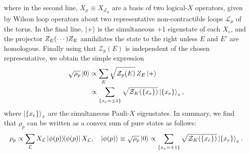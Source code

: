 where in the second line, $\overline{X}_{\mu} \equiv X_{\mathcal{L}_{\mu}}$ are a basis of two logical-$X$ operators, given by Wilson loop operators about two representative non-contractible loops $\mathcal{L}_{\mu}$ of the torus. In the final line, $\ket{+}$ is the simultaneous +1 eigenstate of each $X_e$, and the projector $Z_E \qty( \cdots ) Z_E$ annihilates the state to the right unless $E$ and $E'$ are homologous. Finally using that $\mathcal{Z}_p(E)$ is independent of the chosen representative, we obtain the simple expression
\begin{equation}
    \begin{split}
        \sqrt{\rho_p} \ket{0} &\propto \sum_{E} \sqrt{\mathcal{Z}_p(E)} \, Z_E \ket{+} \\
        &\propto \sum_{\qty{x_e = \pm 1}} \sqrt{\mathcal{Z}_K(\qty{x_e})} \ket{\qty{x_e}}_x ,
    \end{split}
\end{equation}
where $\ket{\qty{x_e}}_x$ are the simultaneous Pauli-$X$ eigenstates. In summary, we find that $\rho_p$ can be written as a convex sum of pure states as follows:
\begin{equation}
\label{eq:phi_p}
    \rho_p \propto \sum_{\mathcal{L}} X_{\mathcal{L}} \dyad{\phi(p)} X_{\mathcal{L}}, \quad \ket{\phi(p)} \equiv \sqrt{\rho_p} \ket{0} \propto \sum_{\qty{x_e = \pm 1}} \sqrt{\mathcal{Z}_K(\qty{x_e})} \ket{\qty{x_e}}_x. 
\end{equation}

